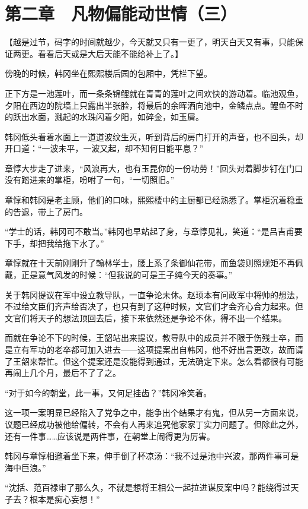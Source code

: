 \section{第二章　凡物偏能动世情（三）}

【越是过节，码字的时间就越少，今天就又只有一更了，明天白天又有事，只能保证两更。看看后天或是大后天能不能给补上了。】

傍晚的时候，韩冈坐在熙熙楼后园的包厢中，凭栏下望。

正下方是一池莲叶，而一条条锦鲤就在青青的莲叶之间欢快的游动着。临池观鱼，夕阳在西边的院墙上只露出半张脸，将最后的余晖洒向池中，金鳞点点。鲤鱼不时的跃出水面，溅起的水珠闪着夕阳，如碎金，如玉屑。

韩冈低头看着水面上一道道波纹生灭，听到背后的房门打开的声音，也不回头，却开口道：“一波未平，一波又起，却不知何日能平息？”

章惇大步走了进来，“风浪再大，也有玉昆你的一份功劳！”回头对着脚步钉在门口没有踏进来的掌柜，吩咐了一句，“一切照旧。”

章惇和韩冈是老主顾，他们的口味，熙熙楼中的主厨都已经熟悉了。掌柜沉着稳重的告退，带上了房门。

“学士的话，韩冈可不敢当。”韩冈也早站起了身，与章惇见礼，笑道：“是吕吉甫要下手，却把我给拖下水了。”

章惇就在十天前刚刚升了翰林学士，腰上系了条御仙花带，而鱼袋则照规矩不再佩戴，正是意气风发的时候：“但我说的可是王子纯今天的奏事。”

关于韩冈提议在军中设立教导队，一直争论未休。赵顼本有问政军中将帅的想法，不过给文臣们齐声给否决了，也只有到了这种时候，文官们才会齐心合力起来。但文官们将天子的想法顶回去后，接下来依然还是争论不休，得不出一个结果。

而就在争论不下的时候，王韶站出来提议，教导队中的成员并不限于伤残士卒，而是立有军功的老卒都可加入进去——这项提案出自韩冈，他不好出言更改，故而请了王韶来帮忙。但这个提案还是没能得到通过，无法确定下来。怎么看都很有可能再闹上几个月，最后不了了之。

“对于如今的朝堂，此一事，又何足挂齿？”韩冈冷笑着。

这一项一案明显已经陷入了党争之中，能争出个结果才有鬼，但从另一方面来说，议题已经成功被他给偏转，不会有人再来追究他家家丁实力问题了。但除此之外，还有一件事……应该说是两件事，在朝堂上闹得更为厉害。

韩冈与章惇相邀着坐下来，伸手倒了杯凉汤：“我不过是池中兴波，那两件事可是海中巨浪。”

“沈括、范百禄审了那么久，不就是想将王相公一起拉进谋反案中吗？能绕得过天子去？根本是痴心妄想！”

